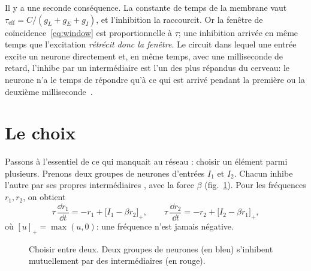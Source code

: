 Il y a une seconde conséquence. La constante de temps de la membrane vaut $\tau_{\text{eff}}=C/(g_L+g_E+g_I)$, et l'inhibition la raccourcit. Or la fenêtre de coïncidence~\eqref{eq:window} est proportionnelle à $\tau$; une inhibition arrivée en même temps que l'excitation \emph{rétrécit donc la fenêtre}. Le circuit dans lequel une entrée excite un neurone directement et, en même temps, avec une milliseconde de retard, l'inhibe par un intermédiaire  est l'un des plus répandus du cerveau: le neurone n'a le temps de répondre qu'à ce qui est arrivé pendant la première ou la deuxième milliseconde~\cite{Pouille2001}.

\section{Le choix}

Passons à l'essentiel de ce qui manquait au réseau : choisir un élément parmi plusieurs. Prenons deux groupes de neurones  d'entrées $I_1$ et $I_2$. Chacun inhibe l'autre par ses propres intermédiaires , avec la force $\beta$ (fig.~\ref{fig:wta}). Pour les fréquences $r_1,r_2$, on obtient
\begin{equation}
\tau\,\frac{\dd r_1}{\dd t} = -r_1 + \bigl[I_1-\beta r_2\bigr]_+ ,\qquad
\tau\,\frac{\dd r_2}{\dd t} = -r_2 + \bigl[I_2-\beta r_1\bigr]_+ ,
\label{eq:wta}
\end{equation}
où $[u]_+=\max(u,0)$: une fréquence n'est jamais négative.

\begin{figure}[t]
\centering
{}
\caption{Choisir entre deux. Deux groupes de neurones  (en bleu) s'inhibent mutuellement par des intermédiaires  (en rouge).}
\label{fig:wta}
\end{figure}

